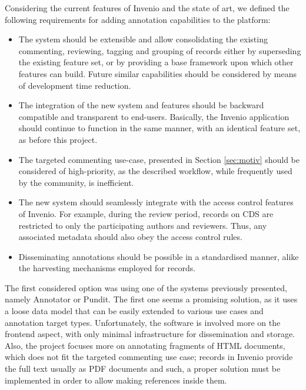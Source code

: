 
Considering the current features of Invenio and the state of art, we
defined the following requirements for adding annotation capabilities to
the platform:
\begin{itemize}
  \item The system should be extensible and allow consolidating the existing
        commenting, reviewing, tagging and grouping of records either by
        superseding the existing feature set, or by providing a base framework
        upon which other features can build. Future similar capabilities should
        be considered by means of development time reduction.
  \item The integration of the new system and features should be backward
        compatible and transparent to end-users. Basically, the Invenio
        application should continue to function in the same manner, with an
        identical feature set, as before this project.
  \item The targeted commenting use-case, presented in Section \ref{sec:motiv}
        should be considered of high-priority, as the described workflow, while
        frequently used by the community, is inefficient.
  \item The new system should seamlessly integrate with the access control
        features of Invenio. For example, during the review period, records on
        CDS are restricted to only the participating authors and reviewers.
        Thus, any associated metadata should also obey the access control rules.
  \item Disseminating annotations should be possible in a standardised manner,
        alike the harvesting mechanisms employed for records.
\end{itemize}

The first considered option was using one of the systems previously presented,
namely Annotator or Pundit. The first one seems a promising solution, as it
uses a loose data model that can be easily extended to various use cases and
annotation target types. Unfortunately, the software is involved more on the
frontend aspect, with only minimal infrastructure for dissemination and
storage. Also, the project focuses more on annotating fragments of HTML
documents, which does not fit the targeted commenting use case; records in
Invenio provide the full text usually as PDF documents and such, a proper
solution must be implemented in order to allow making references inside them.

